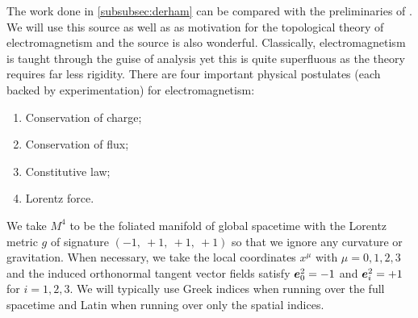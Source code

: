\documentclass[conf]{new-aiaa}
\begin{document}
The work done in \cref{subsubsec:derham} can be compared with the preliminaries of \cite{delphenich_axioms_2005}. We will use this source as well as \cite{hehl_introduction_2003} as motivation for the topological theory of electromagnetism and the source \cite{gross_electromagnetic_2004} is also wonderful. Classically, electromagnetism is taught through the guise of analysis yet this is quite superfluous as the theory requires far less rigidity. There are four important physical postulates (each backed by experimentation) for electromagnetism:
\begin{enumerate}
    \item Conservation of charge;
    \item Conservation of flux;
    \item Constitutive law;
    \item Lorentz force.
\end{enumerate}
We take $M^4$ to be the foliated manifold of global spacetime with the Lorentz metric $g$ of signature $(-1, ~+1,~+1,~+1)$ so that we ignore any curvature or gravitation. When necessary, we take the local coordinates $x^\mu$ with $\mu=0,1,2,3$ and the induced orthonormal tangent vector fields satisfy $\boldsymbol{e}_0^2 = -1$ and $\boldsymbol{e}_i^2=+1$ for $i=1,2,3$. We will typically use Greek indices when running over the full spacetime and Latin when running over only the spatial indices.
\end{document}
